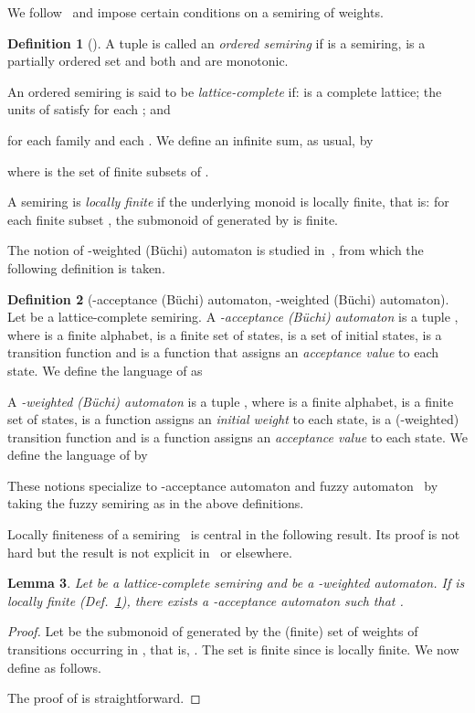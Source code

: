 \documentclass[a4paper,USenglish,numberwithinsect]{lipics}
\theoremstyle{definition}
\newtheorem{defi}{Definition}[section]
\theoremstyle{remark}
\theoremstyle{plain}
\newtheorem{lem}[defi]{Lemma}
\begin{document}
We
follow~\cite{DrosteP07} and
impose certain conditions on a semiring  of weights.
\begin{defi}[\cite{DrosteP07}]\label{def:conditionsOnSemiring}
A tuple  is called an \emph{ordered semiring} if  is a semiring,  is a partially ordered set and both  and  are monotonic.

 An ordered semiring  is said to be
 \emph{lattice-complete} if:  is a complete lattice; the units
  of  satisfy  for each ; and  
  
  for each family  and each . We define an
 infinite sum, as usual, by
  
  where  is the set of finite subsets
 of .

 A semiring is \emph{locally finite} if the underlying monoid  is locally
 finite, that is: for each finite subset , the submonoid of  generated by  is finite.
\end{defi}
The notion of -weighted (B\"uchi) automaton is
studied in~\cite{DrosteP07}, from which the following definition is taken.
\begin{defi}[-acceptance (B\"uchi) automaton, -weighted (B\"uchi) automaton]
  Let  be a lattice-complete semiring. A \emph{-acceptance (B\"uchi) automaton} is a tuple , where  is a finite  alphabet,
  is a finite set of states,  is a set of initial
 states,  is a
 transition function and  is 
 a function that assigns an \emph{acceptance value} to each state.
  We define the language  of  as
  
  
  A \emph{-weighted (B\"uchi) automaton} is a tuple , where  is a finite  alphabet,  is a
 finite set of states,  is a function assigns an
 \emph{initial weight} to each state,  is a (-weighted) transition function
 and  is a function assigns an \emph{acceptance value} to each state.
  We define the language  of  by
  
\end{defi}


These notions specialize to -acceptance automaton and fuzzy automaton~\cite{Rahonis05}
 by taking the fuzzy semiring  as  in the above definitions.

Locally finiteness of a semiring~\cite{DrosteP07} is central in the
following result. Its proof is not hard but
 the result is not explicit in~\cite{DrosteP07} or elsewhere.
\begin{lem}\label{lem:nondeterminization}
  Let  be a lattice-complete semiring
 and  be a -weighted
automaton.
 If
 is locally finite (Def.~\ref{def:conditionsOnSemiring}),
 there exists a -acceptance
automaton  such that
 .
\end{lem}
\begin{proof}
 Let  be the submonoid of  generated by
 the (finite) set of weights of transitions occurring in , that is,
 . The set  is
 finite since  is locally finite.
We now define  as follows.
 
 The proof of  is straightforward.
\end{proof}
\end{document}

